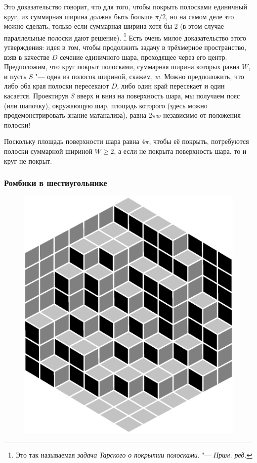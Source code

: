 \documentclass[twoside]{book}
\begin{document}
Это доказательство говорит, что для того, чтобы покрыть полосками единичный круг, их суммарная ширина должна быть больше $\pi/2$, но на самом деле это можно сделать, только если суммарная ширина хотя бы 2 (в этом случае параллельные полоски дают решение).%
\footnote{Это так называемая \emph{задача Тарского о покрытии полосками}. "--- \emph{Прим. ред.}}
Есть очень милое доказательство этого утверждения:
идея в том, чтобы продолжить задачу в трёхмерное пространство, взяв в качестве $D$ сечение единичного шара, проходящее через его центр.
Предположим, что круг покрыт полосками, суммарная ширина которых равна $W$, и пусть $S$ "--- одна из полосок шириной, скажем, $w$.
Можно предположить, что либо оба края полоски пересекают $D$, либо один край пересекает и один касается.
Проектируя $S$ вверх и вниз на поверхность шара, мы получаем пояс (или шапочку),
окружающую шар, площадь которого (здесь можно продемонстрировать знание матанализа), равна 
$2\pi w$ независимо от положения полоски!

Поскольку площадь поверхности шара равна $4\pi$, чтобы её покрыть, потребуются полоски суммарной шириной $W\ge 2$,
а если не покрыта поверхность шара, то и круг не покрыт.


\subsubsection*{Ромбики в шестиугольнике}%

\leavevmode

\begin{figure}[h]
\vskip-10mm
\centering
\includegraphics[scale=0.4]{Figs/Geometry/diamonds}
\vskip-15mm
\end{figure}
\end{document}

